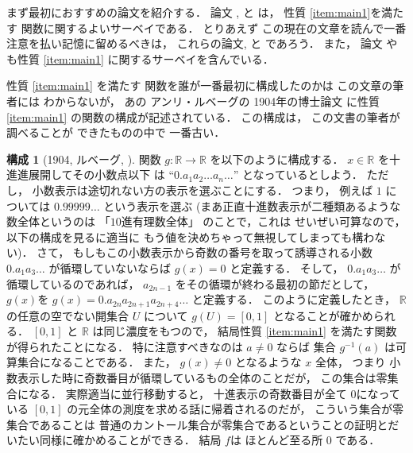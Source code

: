 \documentclass[leqno, a4paper, 12pt]{jsarticle}
\theoremstyle{definition}
\newtheorem{con}[thm]{構成}
\newcommand{\rr}{\mathbb{R}}
\begin{document}
まず最初におすすめの論文を紹介する．
論文
\cite{MR0104770}, 
\cite{MR3815388}
と
\cite{MR3293811}
は，
性質
\ref{item:main1}を満たす
関数に関するよいサーベイである．
とりあえず
この現在の文章を読んで一番注意を払い記憶に留めるべきは，
これらの論文\cite{MR0104770}, 
\cite{MR3815388}
と
\cite{MR3293811}であろう．
また，
論文
\cite{bernardi2017graphs}
や
\cite{MR3641696}
も性質
\ref{item:main1}
に関するサーベイを含んでいる．



性質
\ref{item:main1}
を満たす
関数を誰が一番最初に構成したのかは
この文章の筆者には
わからないが，
あの
アンリ・ルベーグの
1904年の博士論文
\cite{PHDLebesgue}
に性質
\ref{item:main1}
の関数の構成が記述されている．
この構成は，
この文書の筆者が調べることが
できたものの中で
一番古い．



\begin{con}[1904, ルベーグ, \cite{MR0104770}]\label{con:le}
関数
$g\colon \rr\to \rr$
を以下のように構成する．
$x\in \rr$
を十進進展開してその小数点以下
は
``$0.a_{1}a_{2}\dots a_{n}\dots$''
となっているとしよう．
ただし，
小数表示は途切れない方の表示を選ぶことにする．
つまり，
例えば
$1$
については
$0. 99999\dots$
という表示を選ぶ
(まあ正直十進数表示が二種類あるような数全体というのは
「$10$進有理数全体」
のことで，これは
せいぜい可算なので，
以下の構成を見るに適当に
もう値を決めちゃって無視してしまっても構わない)．
さて，
もしもこの小数表示から奇数の番号を取って誘導される小数
$0. a_{1}a_{3}\dots$
が循環していないならば
$g(x)=0$
と定義する．
そして，
$0. a_{1}a_{3}\dots$
が循環しているのであれば，
$a_{2n-1}$
をその循環が終わる最初の節だとして，
$g(x)$を
$g(x)=0. a_{2n}a_{2n+1}a_{2n+4}\dots$
と定義する．
このように定義したとき，
$\rr$
の任意の空でない開集合
$U$
について
$g(U)=[0, 1]$
となることが確かめられる．
$[0, 1]$
と
$\rr$
は同じ濃度をもつので，
結局性質
\ref{item:main1}
を満たす関数が得られたことになる．
特に注意すべきなのは
$a\neq 0$
ならば
集合
$g^{-1}(a)$
は可算集合になることである．
また，
$g(x)\neq 0$
となるような
$x$
全体，
つまり
小数表示した時に奇数番目が循環しているもの全体のことだが，
この集合は零集合になる．
実際適当に並行移動すると，
十進表示の奇数番目が全て
$0$になっている
$[0, 1]$
の元全体の測度を求める話に帰着されるのだが，
こういう集合が零集合であることは
普通のカントール集合が零集合であるということの証明とだいたい同様に確かめることができる．
結局
$f$は
ほとんど至る所
$0$
である．
\end{con}
\end{document}
